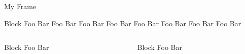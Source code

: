 \documentclass{beamer}
\begin{document}
\begin{frame}{My Frame}
    \begin{block}{Block}
        Foo Bar  Foo Bar  Foo Bar  Foo Bar  Foo Bar  Foo Bar  Foo Bar  Foo Bar 
    \end{block}

    \begin{columns}[totalwidth=1.02\textwidth]
        \begin{column}{.47\textwidth}
            \begin{exampleblock}{Block}
            Foo Bar
            \end{exampleblock}
        \end{column}
        \begin{column}{.47\textwidth}
            \begin{block}{Block}
              Foo Bar
            \end{block} 
        \end{column}
    \end{columns}

\end{frame}
\end{document}
